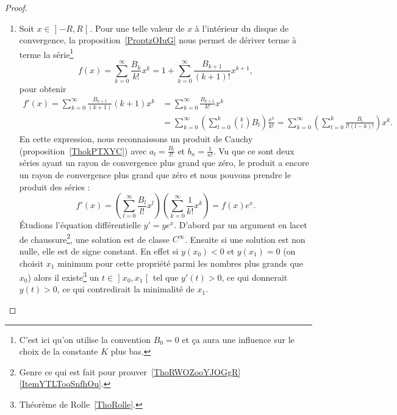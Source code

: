 \begin{proof}
\begin{enumerate}
        \item

            Soit \( x\in\mathopen] -R , R \mathclose[\). Pour une telle valeur de \( x\) à l'intérieur du disque de convergence, la proposition~\ref{ProptzOIuG} nous permet de dériver terme à terme la série\footnote{C'est ici qu'on utilise la convention \( B_0=0\) et ça aura une influence sur le choix de la constante \( K\) plus bas.}
                \begin{equation}
                    f(x)=\sum_{k=0}^{\infty}\frac{ B_k }{ k! }x^k=1+\sum_{k=0}^{\infty}\frac{ B_{k+1} }{ (k+1)! }x^{k+1},
                \end{equation}
                pour obtenir
                \begin{subequations}
                    \begin{align}
                    f'(x)=\sum_{k=0}^{\infty}\frac{ B_{k+1} }{ (k+1) }(k+1)x^k&=\sum_{k=0}^{\infty}\frac{ B_{k+1} }{ k! }x^k\\
                        &=\sum_{k=0}^{\infty}\left( \sum_{l=0}^k{k\choose l}B_l \right)\frac{ x^k }{ k! }=\sum_{k=0}^{\infty}\left( \sum_{l=0}^k\frac{ B_l }{ l!(l-k)! } \right)x^k.
                    \end{align}
                \end{subequations}
                En cette expression, nous reconnaissons un produit de Cauchy (proposition~\ref{ThokPTXYC}) avec \( a_l=\frac{ B_l }{ l! }\) et \( b_n=\frac{ 1 }{ n! }\). Vu que ce sont deux séries ayant un rayon de convergence plus grand que zéro, le produit a encore un rayon de convergence plus grand que zéro et nous pouvons prendre le produit des séries :
                \begin{equation}
                    f'(x)=\left( \sum_{l=0}^{\infty}\frac{ B_l }{ l! }x^l \right)\left( \sum_{k=0}^{\infty}\frac{1}{ k! }x^k \right)=f(x) e^{x}.
                \end{equation}
            Étudions l'équation différentielle \( y'=ye^x\). D'abord par un argument en lacet de chaussure\footnote{Genre ce qui est fait pour prouver~\ref{ThoRWOZooYJOGgR}\ref{ItemYTLTooSnfhOu}.}, une solution est de classe \(  C^{\infty}\). Ensuite si une solution est non nulle, elle est de signe constant. En effet si \( y(x_0)<0\) et \( y(x_1)=0\) (on choisit \( x_1\) minimum pour cette propriété parmi les nombres plus grands que \( x_0\)) alors il existe\footnote{Théorème de Rolle~\ref{ThoRolle}.} un \( t\in\mathopen] x_0 , x_1 \mathclose[\) tel que \( y'(t)>0\), ce qui donnerait \( y(t)>0\), ce qui contredirait la minimalité de \( x_1\).


\end{enumerate}
\end{proof}
